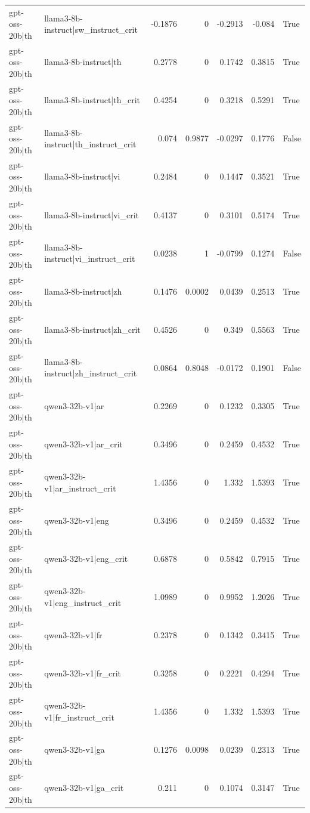 \begin{table}
\begin{tabular}{l l r r r r l}
gpt-oss-20b|th & llama3-8b-instruct|sw_instruct_crit & -0.1876 & 0 & -0.2913 & -0.084 & True \\
gpt-oss-20b|th & llama3-8b-instruct|th & 0.2778 & 0 & 0.1742 & 0.3815 & True \\
gpt-oss-20b|th & llama3-8b-instruct|th_crit & 0.4254 & 0 & 0.3218 & 0.5291 & True \\
gpt-oss-20b|th & llama3-8b-instruct|th_instruct_crit & 0.074 & 0.9877 & -0.0297 & 0.1776 & False \\
gpt-oss-20b|th & llama3-8b-instruct|vi & 0.2484 & 0 & 0.1447 & 0.3521 & True \\
gpt-oss-20b|th & llama3-8b-instruct|vi_crit & 0.4137 & 0 & 0.3101 & 0.5174 & True \\
gpt-oss-20b|th & llama3-8b-instruct|vi_instruct_crit & 0.0238 & 1 & -0.0799 & 0.1274 & False \\
gpt-oss-20b|th & llama3-8b-instruct|zh & 0.1476 & 0.0002 & 0.0439 & 0.2513 & True \\
gpt-oss-20b|th & llama3-8b-instruct|zh_crit & 0.4526 & 0 & 0.349 & 0.5563 & True \\
gpt-oss-20b|th & llama3-8b-instruct|zh_instruct_crit & 0.0864 & 0.8048 & -0.0172 & 0.1901 & False \\
gpt-oss-20b|th & qwen3-32b-v1|ar & 0.2269 & 0 & 0.1232 & 0.3305 & True \\
gpt-oss-20b|th & qwen3-32b-v1|ar_crit & 0.3496 & 0 & 0.2459 & 0.4532 & True \\
gpt-oss-20b|th & qwen3-32b-v1|ar_instruct_crit & 1.4356 & 0 & 1.332 & 1.5393 & True \\
gpt-oss-20b|th & qwen3-32b-v1|eng & 0.3496 & 0 & 0.2459 & 0.4532 & True \\
gpt-oss-20b|th & qwen3-32b-v1|eng_crit & 0.6878 & 0 & 0.5842 & 0.7915 & True \\
gpt-oss-20b|th & qwen3-32b-v1|eng_instruct_crit & 1.0989 & 0 & 0.9952 & 1.2026 & True \\
gpt-oss-20b|th & qwen3-32b-v1|fr & 0.2378 & 0 & 0.1342 & 0.3415 & True \\
gpt-oss-20b|th & qwen3-32b-v1|fr_crit & 0.3258 & 0 & 0.2221 & 0.4294 & True \\
gpt-oss-20b|th & qwen3-32b-v1|fr_instruct_crit & 1.4356 & 0 & 1.332 & 1.5393 & True \\
gpt-oss-20b|th & qwen3-32b-v1|ga & 0.1276 & 0.0098 & 0.0239 & 0.2313 & True \\
gpt-oss-20b|th & qwen3-32b-v1|ga_crit & 0.211 & 0 & 0.1074 & 0.3147 & True \\

\end{tabular}
\end{table}
